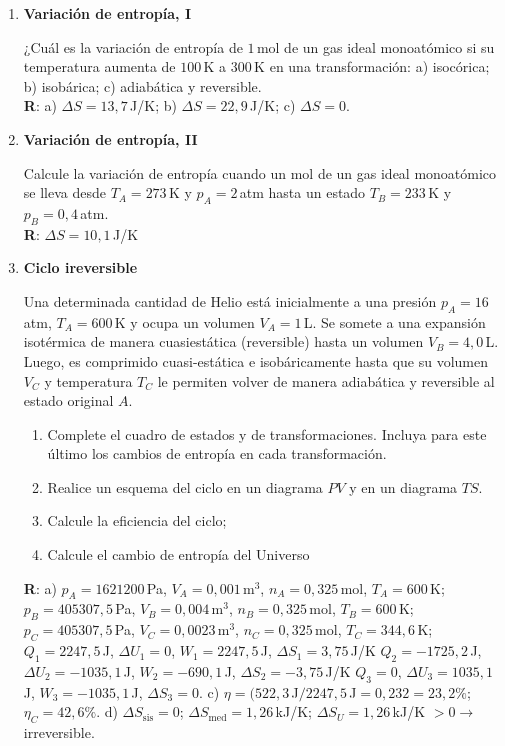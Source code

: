 \documentclass[a4paper,12pt]{article}
\begin{document}
\begin{enumerate}
	\item {\bf{Variación de entropía, I}}

		¿Cuál es la variación de entropía de $1$\,mol de un gas ideal
		monoatómico si su temperatura aumenta de $100$\,K a $300$\,K en una
		transformación: a) isocórica; b) isobárica; c) adiabática y reversible.
		\\{\bf{R}}: a) $\Delta S= 13,7$\,J/K; b) $\Delta S=22,9$\,J/K; c)
		$\Delta S=0$.
	
	\item {\bf{Variación de entropía, II}}
		
		Calcule la variación de entropía cuando un mol de un gas ideal
		monoatómico se lleva desde $T_A=273$\,K y $p_A=2$\,atm hasta un estado
		$T_B=233$\,K y $p_B=0,4$\,atm.
		\\{\bf{R}}: $\Delta S= 10,1$\,J/K

	\item {\bf{Ciclo ireversible}}

		Una determinada cantidad de Helio está inicialmente a una presión
		$p_A=16$\,atm, $T_A=600$\,K y ocupa un volumen $V_A=1$\,L. Se somete a
		una expansión isotérmica de manera cuasiestática (reversible) hasta un
		volumen $V_B=4,0$\,L. Luego, es comprimido cuasi-estática e
		isobáricamente hasta que su volumen $V_C$ y temperatura $T_C$ le
		permiten volver de manera adiabática y reversible al estado original
		$A$. 
		\begin{enumerate}
			\item Complete el cuadro de estados y de transformaciones. Incluya
				para este último los cambios de entropía en cada
				transformación. 
			\item Realice un esquema del ciclo en un diagrama $PV$ y en un
				diagrama $TS$. 
			\item Calcule la eficiencia del ciclo; 
			\item Calcule el cambio de entropía del Universo
		\end{enumerate}
        {\bf{R}}: a) 
		$p_A=1621200$\,Pa, $V_A=0,001$\,m$^3$, $n_A=0,325$\,mol, $T_A=600$\,K; 
		$p_B=405307,5$\,Pa, $V_B=0,004$\,m$^3$, $n_B=0,325$\,mol, $T_B=600$\,K; 
		$p_C=405307,5$\,Pa, $V_C=0,0023$\,m$^3$, $n_C=0,325$\,mol, $T_C=344,6$\,K;
		$Q_1=2247,5$\,J, $\Delta U_1=0$, $W_1=2247,5$\,J, $\Delta S_1=3,75$\,J/K
		$Q_2=-1725,2$\,J, $\Delta U_2=-1035,1$\,J, $W_2=-690,1$\,J, $\Delta S_2=-3,75$\,J/K
		$Q_3=0$, $\Delta U_3=1035,1$\,J, $W_3=-1035,1$\,J, $\Delta S_3=0$.
		c) $\eta=(522,3$\,J$/2247,5$\,J$ = 0,232 = 23,2\%$; $\eta_C=42,6\%$.
		d) $\Delta S_{\mathrm{sis}} = 0$; $\Delta S_{\mathrm{med}}=1,26$\,kJ/K;
		$\Delta S_U=1,26$\,kJ/K $>0 \to$ irreversible. 


\end{enumerate}
\end{document}
